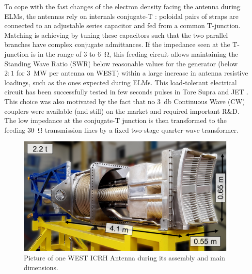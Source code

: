 \documentclass[12p]{iopart}
\begin{document}
To cope with the fast changes of the electron density facing the antenna during ELMs, the antennas rely on internals conjugate-T \cite{bosia2003-1}: poloidal pairs of straps are connected to an adjustable series capacitor and fed from a common T-junction. Matching is achieving by tuning these capacitors such that the two parallel branches have complex conjugate admittances. If the impedance seen at the T-junction is in the range of 3 to \SI{6}{\ohm}, this feeding circuit allows maintaining the Standing Wave Ratio (SWR) below reasonable values for the generator (below $2{:}1$ for \SI{3}{\mega\watt} per antenna on WEST) within a large increase in antenna resistive loadings, such as the ones expected during ELMs. This load-tolerant electrical circuit has been successfully tested in few seconds pulses in Tore Supra \cite{vulliez2008} and JET \cite{durodie2012-2}. This choice was also motivated by the fact that no \SI{3}{\decibel} Continuous Wave (CW) couplers were available (and still) on the market and required important R\&D. The low impedance at the conjugate-T junction is then transformed to the feeding \SI{30}{\ohm} transmission lines by a fixed two-stage quarter-wave transformer.


\begin{figure}
	\centering
	\includegraphics[width=0.95\linewidth]{figures/antenna}
	\caption{Picture of one WEST ICRH Antenna during its assembly and main dimensions.}
	\label{fig:antenna}
\end{figure}
\end{document}
